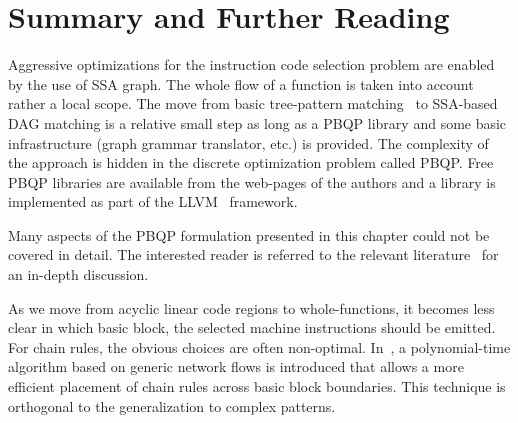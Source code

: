 \section{Summary and Further Reading}
Aggressive optimizations for the instruction code selection problem are enabled by the use of SSA graph.
The whole flow of a function is taken into account
rather a local scope. The move from basic tree-pattern
matching~\cite{aj:76} to SSA-based DAG matching is a relative small
step as long as a PBQP library and some basic infrastructure (graph
grammar translator, etc.)  is provided. The complexity of the approach
is hidden in the discrete optimization problem called PBQP. Free PBQP
libraries are available from the web-pages of the authors and a
library is implemented as part of the LLVM~\cite{wwwLLVM} framework.

Many aspects of the PBQP formulation presented in this chapter could
not be covered in detail. The interested reader is referred to the
relevant literature~\cite{EcksteinKS03,Ebner08} for an in-depth
discussion.

As we move from acyclic linear code regions to whole-functions, it
becomes less clear in which basic block, the selected machine
instructions should be emitted. For chain rules, the obvious choices
are often non-optimal. In~\cite{1269857}, a polynomial-time algorithm
based on generic network flows is introduced that allows a more
efficient placement of chain rules across basic block boundaries. This
technique is orthogonal to the generalization to complex patterns.

